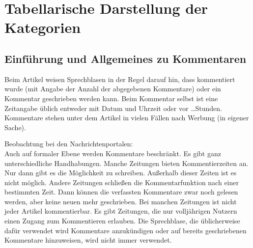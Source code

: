 \chapter{Tabellarische Darstellung der Kategorien}

\section{Einführung und Allgemeines zu Kommentaren}

Beim Artikel weisen Sprechblasen in der Regel darauf hin, dass kommentiert wurde (mit Angabe der Anzahl der abgegebenen Kommentare) oder ein Kommentar geschrieben werden kann. 
Beim Kommentar selbst ist eine Zeitangabe üblich
entweder mit Datum und Uhrzeit oder \glqq vor \ldots Stunden\grqq. 
Kommentare stehen unter dem Artikel in vielen Fällen nach Werbung (in eigener Sache).

Beobachtung bei den Nachrichtenportalen:\\
Auch auf formaler Ebene werden Kommentare beschränkt. Es gibt ganz unterschiedliche Handhabungen. Manche Zeitungen bieten Kommentierzeiten an. Nur dann gibt es die Möglichkeit zu schreiben. Außerhalb dieser Zeiten ist es nicht möglich. Andere Zeitungen schließen die Kommentarfunktion nach einer bestimmten Zeit. Dann können die verfassten Kommentare zwar noch gelesen werden, aber keine neuen mehr geschrieben. Bei manchen Zeitungen ist nicht jeder Artikel kommentierbar. Es gibt Zeitungen, die nur volljährigen Nutzern einen Zugang zum Kommentieren erlauben. 
Die Sprechblase, die üblicherweise dafür verwendet wird Kommentare anzukündigen oder auf bereits geschriebenen Kommentare hinzuweisen, wird nicht immer verwendet.

